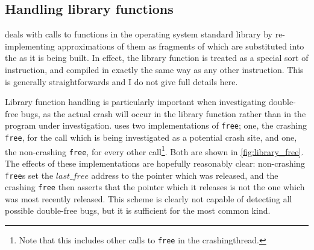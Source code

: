 \subsection{Handling library functions}
\label{sect:derive:library_functions}

{\Technique} deals with calls to functions in the operating system
standard library by re-implementing approximations of them as
fragments of {\StateMachine} which are substituted into the
{\StateMachines} as it is being built.  In effect, the library
function is treated as a special sort of instruction, and compiled in
exactly the same way as any other instruction.  This is generally
straightforwards and I do not give full details here.

 Library function handling is particularly
important when investigating double-free bugs, as the actual crash
will occur in the library function rather than in the program under
investigation.  {\Technique} uses two implementations of
\texttt{free}; one, the crashing \texttt{free}, for the call which is
being investigated as a potential crash site, and one, the
non-crashing \texttt{free}, for every other call\footnote{Note that
  this includes other calls to \texttt{free} in the
  \gls{crashingthread}.}.  Both are shown in
\autoref{fig:library_free}.  The effects of these implementations are
hopefully reasonably clear: non-crashing \texttt{free}s
set the $\mathit{last\_free}$ address to the pointer which was
released, and the crashing \texttt{free} then asserts that the pointer
which it releases is not the one which was most recently released.
This scheme is clearly not capable of detecting all possible
double-free bugs, but it is sufficient for the most common kind.

